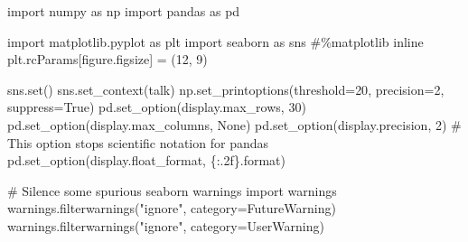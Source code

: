 \documentclass[
  letterpaper,
  DIV=11,
  numbers=noendperiod]{scrreprt}
\newenvironment{Shaded}{\begin{snugshade}}{\end{snugshade}}
\newcommand{\BuiltInTok}[1]{\textcolor[rgb]{0.00,0.23,0.31}{#1}}
\newcommand{\CommentTok}[1]{\textcolor[rgb]{0.37,0.37,0.37}{#1}}
\newcommand{\DecValTok}[1]{\textcolor[rgb]{0.68,0.00,0.00}{#1}}
\newcommand{\ImportTok}[1]{\textcolor[rgb]{0.00,0.46,0.62}{#1}}
\newcommand{\NormalTok}[1]{\textcolor[rgb]{0.00,0.23,0.31}{#1}}
\newcommand{\OperatorTok}[1]{\textcolor[rgb]{0.37,0.37,0.37}{#1}}
\newcommand{\PreprocessorTok}[1]{\textcolor[rgb]{0.68,0.00,0.00}{#1}}
\newcommand{\SpecialCharTok}[1]{\textcolor[rgb]{0.37,0.37,0.37}{#1}}
\newcommand{\StringTok}[1]{\textcolor[rgb]{0.13,0.47,0.30}{#1}}
\newcommand{\VariableTok}[1]{\textcolor[rgb]{0.07,0.07,0.07}{#1}}
\begin{document}
\begin{Shaded}
\begin{Highlighting}[]
\ImportTok{import}\NormalTok{ numpy }\ImportTok{as}\NormalTok{ np}
\ImportTok{import}\NormalTok{ pandas }\ImportTok{as}\NormalTok{ pd}

\ImportTok{import}\NormalTok{ matplotlib.pyplot }\ImportTok{as}\NormalTok{ plt}
\ImportTok{import}\NormalTok{ seaborn }\ImportTok{as}\NormalTok{ sns}
\CommentTok{\#\%matplotlib inline}
\NormalTok{plt.rcParams[}\StringTok{\textquotesingle{}figure.figsize\textquotesingle{}}\NormalTok{] }\OperatorTok{=}\NormalTok{ (}\DecValTok{12}\NormalTok{, }\DecValTok{9}\NormalTok{)}

\NormalTok{sns.}\BuiltInTok{set}\NormalTok{()}
\NormalTok{sns.set\_context(}\StringTok{\textquotesingle{}talk\textquotesingle{}}\NormalTok{)}
\NormalTok{np.set\_printoptions(threshold}\OperatorTok{=}\DecValTok{20}\NormalTok{, precision}\OperatorTok{=}\DecValTok{2}\NormalTok{, suppress}\OperatorTok{=}\VariableTok{True}\NormalTok{)}
\NormalTok{pd.set\_option(}\StringTok{\textquotesingle{}display.max\_rows\textquotesingle{}}\NormalTok{, }\DecValTok{30}\NormalTok{)}
\NormalTok{pd.set\_option(}\StringTok{\textquotesingle{}display.max\_columns\textquotesingle{}}\NormalTok{, }\VariableTok{None}\NormalTok{)}
\NormalTok{pd.set\_option(}\StringTok{\textquotesingle{}display.precision\textquotesingle{}}\NormalTok{, }\DecValTok{2}\NormalTok{)}
\CommentTok{\# This option stops scientific notation for pandas}
\NormalTok{pd.set\_option(}\StringTok{\textquotesingle{}display.float\_format\textquotesingle{}}\NormalTok{, }\StringTok{\textquotesingle{}}\SpecialCharTok{\{:.2f\}}\StringTok{\textquotesingle{}}\NormalTok{.}\BuiltInTok{format}\NormalTok{)}

\CommentTok{\# Silence some spurious seaborn warnings}
\ImportTok{import}\NormalTok{ warnings}
\NormalTok{warnings.filterwarnings(}\StringTok{"ignore"}\NormalTok{, category}\OperatorTok{=}\PreprocessorTok{FutureWarning}\NormalTok{)}
\NormalTok{warnings.filterwarnings(}\StringTok{"ignore"}\NormalTok{, category}\OperatorTok{=}\PreprocessorTok{UserWarning}\NormalTok{)}
\end{Highlighting}
\end{Shaded}
\end{document}

